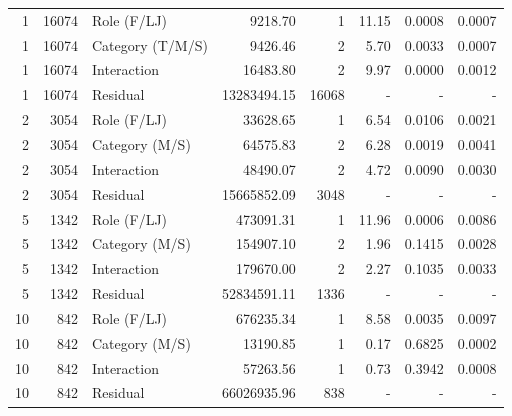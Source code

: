 \begin{table}[H]
\begin{tabular}{r r l r r r r r}
\midrule
1 & 16074 & Role (F/LJ) & 9218.70 & 1 & 11.15 & 0.0008 & 0.0007 \\ 
1 & 16074 & Category (T/M/S) & 9426.46 & 2 & 5.70 & 0.0033 & 0.0007 \\ 
1 & 16074 & Interaction & 16483.80 & 2 & 9.97 & 0.0000 & 0.0012 \\ 
1 & 16074 & Residual & 13283494.15 & 16068 & - & - & -   \\ 
2 & 3054 & Role (F/LJ) & 33628.65 & 1 & 6.54 & 0.0106 & 0.0021 \\ 
2 & 3054 & Category (M/S) & 64575.83 & 2 & 6.28 & 0.0019 & 0.0041 \\ 
2 & 3054 & Interaction & 48490.07 & 2 & 4.72 & 0.0090 & 0.0030 \\ 
2 & 3054 & Residual & 15665852.09 & 3048 & - & - & -   \\ 
5 & 1342 & Role (F/LJ) & 473091.31 & 1 & 11.96 & 0.0006 & 0.0086 \\ 
5 & 1342 & Category (M/S) & 154907.10 & 2 & 1.96 & 0.1415 & 0.0028 \\ 
5 & 1342 & Interaction & 179670.00 & 2 & 2.27 & 0.1035 & 0.0033 \\ 
5 & 1342 & Residual & 52834591.11 & 1336 & - & - & -   \\ 
10 & 842 & Role (F/LJ) & 676235.34 & 1 & 8.58 & 0.0035 & 0.0097 \\ 
10 & 842 & Category (M/S) & 13190.85 & 1 & 0.17 & 0.6825 & 0.0002 \\ 
10 & 842 & Interaction & 57263.56 & 1 & 0.73 & 0.3942 & 0.0008 \\ 
10 & 842 & Residual & 66026935.96 & 838 & - & - & -   \\ 
\bottomrule
\end{tabular}%
\label{tab:standard_anova_methods} 
\end{table}
\newpage 
